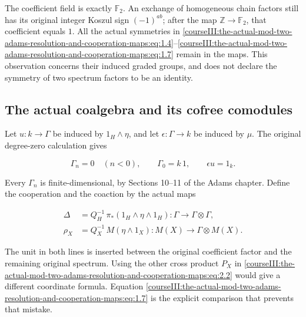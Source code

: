 The coefficient field is exactly \(\mathbb F_2\). An exchange of homogeneous chain factors still has its original integer Koszul sign \((-1)^{ab}\); after the map \(\mathbb Z\to\mathbb F_2\), that coefficient equals \(1\). All the actual symmetries in \eqref{courseIII:the-actual-mod-two-adams-resolution-and-cooperation-maps:eq:1.4}--\eqref{courseIII:the-actual-mod-two-adams-resolution-and-cooperation-maps:eq:1.7} remain in the maps. This observation concerns their induced graded groups, and does not declare the symmetry of two spectrum factors to be an identity.

\subsection{The actual coalgebra and its cofree comodules}
\label{courseIII:the-actual-mod-two-adams-resolution-and-cooperation-maps:cooperation-actual-coalgebra}

\label{courseIII:the-actual-mod-two-adams-resolution-and-cooperation-maps:section-2}\label{courseIII:actual-resolution:2}

Let \(u:k\to\Gamma\) be induced by \(1_H\wedge\eta\), and let \(\epsilon:\Gamma\to k\) be induced by \(\mu\). The original degree-zero calculation gives

\begin{equation}
\Gamma_n=0\quad(n<0),\qquad \Gamma_0=k\,1,
 \qquad\epsilon u=1_k.
 \label{courseIII:the-actual-mod-two-adams-resolution-and-cooperation-maps:eq:2.1}
\end{equation}

Every \(\Gamma_n\) is finite-dimensional, by Sections 10--11 of the Adams chapter. Define the cooperation and the coaction by the actual maps

\begin{equation}
\begin{aligned}
 \Delta&=Q_H^{-1}\,\pi_*(1_H\wedge\eta\wedge1_H):
       \Gamma\longrightarrow\Gamma\otimes\Gamma,\\
 \rho_X&=Q_X^{-1}\,M(\eta\wedge1_X):
       M(X)\longrightarrow\Gamma\otimes M(X).
 \end{aligned}
 \label{courseIII:the-actual-mod-two-adams-resolution-and-cooperation-maps:eq:2.2}
\end{equation}

The unit in both lines is inserted between the original coefficient factor and the remaining original spectrum. Using the other cross product \(P_X\) in \eqref{courseIII:the-actual-mod-two-adams-resolution-and-cooperation-maps:eq:2.2} would give a different coordinate formula. Equation \eqref{courseIII:the-actual-mod-two-adams-resolution-and-cooperation-maps:eq:1.7} is the explicit comparison that prevents that mistake.

